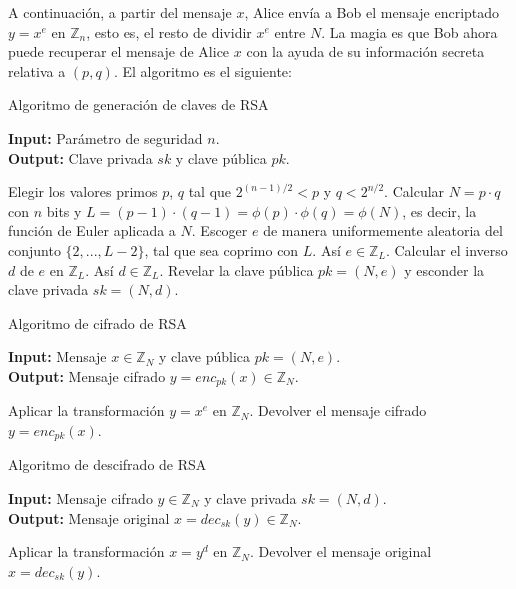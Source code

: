     A continuación, a partir del mensaje $x$, Alice envía a Bob el mensaje encriptado $y = x^{e}$ en $\mathbb{Z}_{n}$, esto es, el resto de dividir $x^{e}$ entre $N$. La magia es que Bob ahora puede recuperar el mensaje de Alice $x$ con la ayuda de su información secreta relativa a $(p,q)$. El algoritmo es el siguiente:

    \begin{algorithm}[H]
        \caption{Algoritmo de generación de claves de RSA}
        \textbf{Input:} Parámetro de seguridad $n$.\\
        \textbf{Output:} Clave privada $sk$ y clave pública $pk$.
        \bigskip
        \begin{algorithmic}[1]
            \State Elegir los valores primos $p$, $q$ tal que $2^{(n-1)/2} < p$ y $q < 2^{n/2}$.
            \State Calcular $N = p \cdot q$ con $n$ bits y $L = (p - 1) \cdot (q - 1) = \phi(p) \cdot \phi(q) = \phi(N)$, es decir, la función de Euler aplicada a $N$.
            \State Escoger $e$ de manera uniformemente aleatoria del conjunto $\{2, ... , L-2\}$, tal que sea coprimo con $L$. Así $e \in \mathbb{Z}_{L}$.
            \State Calcular el inverso $d$ de $e$ en $\mathbb{Z}_{L}$. Así $d \in \mathbb{Z}_{L}$.
            \State Revelar la clave pública $pk = (N, e)$ y esconder la clave privada $sk = (N, d)$.
        \end{algorithmic}
    \end{algorithm}

    \begin{algorithm}[H]
        \caption{Algoritmo de cifrado de RSA}
        \textbf{Input:} Mensaje $x \in \mathbb{Z}_{N}$ y clave pública $pk = (N, e)$.\\
        \textbf{Output:} Mensaje cifrado $y = enc_{pk}(x) \in \mathbb{Z}_{N}$.
        \bigskip
        \begin{algorithmic}[1]
            \State Aplicar la transformación $y = x^{e}$ en $\mathbb{Z}_{N}$.
            \State Devolver el mensaje cifrado $y = enc_{pk}(x)$.
        \end{algorithmic}
    \end{algorithm}
    
    \begin{algorithm}[H]
        \caption{Algoritmo de descifrado de RSA}
        \textbf{Input:} Mensaje cifrado $y \in \mathbb{Z}_{N}$ y clave privada $sk = (N, d)$.\\
        \textbf{Output:} Mensaje original $x = dec_{sk}(y) \in \mathbb{Z}_{N}$.
        \bigskip
        \begin{algorithmic}[1]
            \State Aplicar la transformación $x = y^{d}$ en $\mathbb{Z}_{N}$.
            \State Devolver el mensaje original $x = dec_{sk}(y)$.
        \end{algorithmic}
    \end{algorithm}
    
